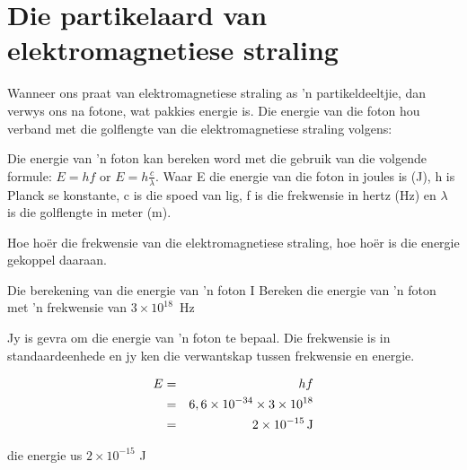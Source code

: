             \section{Die partikelaard van elektromagnetiese straling}
            \nopagebreak
      \label{m38778*id188832} Wanneer ons praat van elektromagnetiese straling as 'n partikeldeeltjie, dan verwys ons na fotone, wat pakkies energie is. Die energie van die foton hou verband met die golflengte van die elektromagnetiese straling volgens:\par 
\label{m38778*fhsst!!!underscore!!!id476} 
      \label{m38778*id188898} Die energie van 'n foton kan bereken word met die gebruik van die volgende formule: $E=hf$ or $E=h\frac{c}{\lambda }$.
Waar E die energie van die foton in joules is (J), h is Planck se konstante, c is die spoed van lig, f is die frekwensie in hertz (Hz) en $\lambda $ is die golflengte in meter (m).\par Hoe ho\"er die frekwensie van die e\-lek\-tro\-mag\-ne\-tie\-se straling, hoe ho\"er is die energie gekoppel daaraan.  
\begin{wex}
{Die berekening van die energie van 'n foton I
}
{
Bereken die energie van 'n foton met 'n frekwensie van $3\ensuremath{\times}{10}^{18}$~Hz}
{
Jy is gevra om die energie van 'n foton te bepaal. Die frekwensie is in standaardeenhede en jy ken die verwantskap tussen frekwensie en energie.

\begin{eqnarray*}
E& =& hf\\ 
& =& 6,6\ensuremath{\times}{10}^{-34}\ensuremath{\times}3\ensuremath{\times}{10}^{18}\\ 
& =& 2\ensuremath{\times}{10}^{-15}\phantom{\rule{0.166667em}{0ex}}\text{J}
\end{eqnarray*}

die energie us $2\times10^{-15}$ J
}
\end{wex}
    
